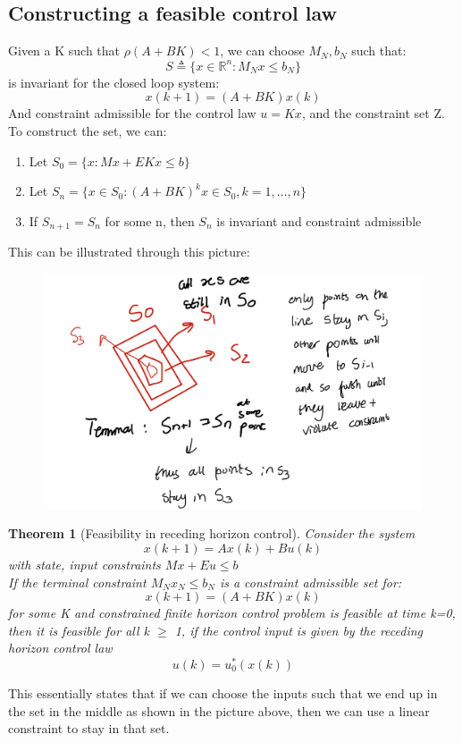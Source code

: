 \documentclass{article}
\newtheorem{theorem}{Theorem}[section]
\begin{document}
\subsection{Constructing a feasible control law}
Given a K such that $\rho(A+BK) < 1$, we can choose $M_N,b_N$ such that:
\[
S \triangleq \{x \in \mathbb R^n : M_N x \leq b_N \}
\]
is invariant for the closed loop system:
\[
x(k+1) = (A+BK)x(k)
\]
And constraint admissible for the control law $u=Kx$, and the constraint set Z. \\
To construct the set, we can:
\begin{enumerate}
    \item Let $S_0 = \{ x : Mx + EKx \leq b \}$
    \item Let $S_n = \{ x \in S_0 : (A+BK)^k x \in S_0, k=1, \hdots, n \}$
    \item If $S_{n+1} = S_n$ for some n, then $S_n$ is invariant and constraint admissible
\end{enumerate}
This can be illustrated through this picture:
\begin{figure}[H]
    \centering
    \includegraphics[width=0.6\linewidth]{Screenshot 2023-02-28 at 14.59.26.png}
\end{figure}
\begin{theorem}[Feasibility in receding horizon control]
    Consider the system
    \[
    x(k+1) = Ax(k) + Bu(k)
    \]
    with state, input constraints $Mx + Eu \leq b$ \\
    If the terminal constraint $M_Nx_N \leq b_N$ is a constraint admissible set for:
    \[
    x(k+1) = (A+BK)x(k)
    \]
    for some K and constrained finite horizon control problem is feasible at time k=0, then it is feasible for all k $\geq$ 1, if the control input is given by the receding horizon control law
    \[
    u(k)  = u_0^*(x(k))
    \]
\end{theorem}
This essentially states that if we can choose the inputs such that we end up in the set in the middle as shown in the picture above, then we can use a linear constraint to stay in that set.
\end{document}
